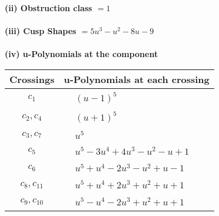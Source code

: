 \documentclass[1p]{elsarticle_modified}
\theoremstyle{definition}
\begin{document}
\flushleft \textbf{(ii) Obstruction class $= 1$}\\~\\
\flushleft \textbf{(iii) Cusp Shapes $= 5 u^3- u^2-8 u-9$}\\~\\
\newpage\renewcommand{\arraystretch}{1}
\flushleft \textbf{(iv) u-Polynomials at the component}\newline \\
\begin{tabular}{m{50pt}|m{274pt}}
Crossings & \hspace{64pt}u-Polynomials at each crossing \\
\hline $$\begin{aligned}c_{1}\end{aligned}$$&$\begin{aligned}
&(u-1)^5
\end{aligned}$\\
\hline $$\begin{aligned}c_{2},c_{4}\end{aligned}$$&$\begin{aligned}
&(u+1)^5
\end{aligned}$\\
\hline $$\begin{aligned}c_{3},c_{7}\end{aligned}$$&$\begin{aligned}
&u^5
\end{aligned}$\\
\hline $$\begin{aligned}c_{5}\end{aligned}$$&$\begin{aligned}
&u^5-3 u^4+4 u^3- u^2- u+1
\end{aligned}$\\
\hline $$\begin{aligned}c_{6}\end{aligned}$$&$\begin{aligned}
&u^5+u^4-2 u^3- u^2+u-1
\end{aligned}$\\
\hline $$\begin{aligned}c_{8},c_{11}\end{aligned}$$&$\begin{aligned}
&u^5+u^4+2 u^3+u^2+u+1
\end{aligned}$\\
\hline $$\begin{aligned}c_{9},c_{10}\end{aligned}$$&$\begin{aligned}
&u^5- u^4-2 u^3+u^2+u+1
\end{aligned}$\\
\hline
\end{tabular}\\~\\
\end{document}
